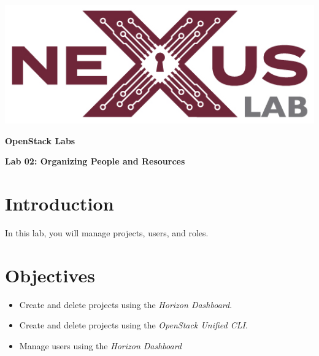 \documentclass[letterpaper, 12pt]{article}
\begin{document}
\begin{titlepage}
    \centering
    \includegraphics[scale=0.5]{images/nexus_lab_logo.png}

    \vspace*{\baselineskip}

    \textbf{\Large OpenStack Labs}

    \vspace*{\baselineskip}

    \textbf{\Large Lab 02: Organizing People and Resources}
    \vspace*{\fill}
\end{titlepage}

\pagestyle{fancy}
\tableofcontents
\clearpage

{
    \fancyhf{}
    \fancyfoot[R]{\footnotesize\thepage}
    \renewcommand{\headrulewidth}{0pt}
}

\section*{Introduction}
\label{sec:introduction}
In this lab, you will manage projects, users, and roles.

\section*{Objectives}
\label{sec:objectives}
\begin{itemize}[itemsep=0pt]
    \item Create and delete projects using the \textit{Horizon Dashboard}.
    \item Create and delete projects using the \textit{OpenStack Unified CLI}.
    \item Manage users using the \textit{Horizon Dashboard}
\end{itemize}
\clearpage
\end{document}
